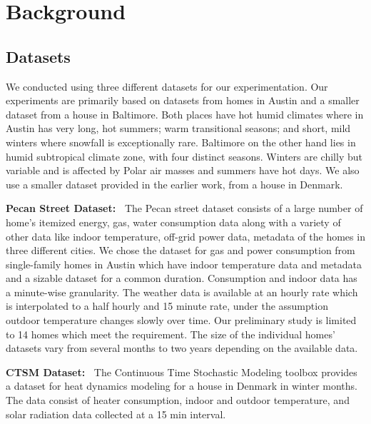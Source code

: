 
\section{Background}

\subsection{Datasets}
\indent We conducted using three different datasets for our experimentation. Our experiments are primarily based on datasets from homes in Austin and a smaller dataset from a house in Baltimore. Both places have hot humid climates where in Austin has very long, hot summers; warm transitional seasons; and short, mild winters where snowfall is exceptionally rare. Baltimore on the other hand lies in humid subtropical climate zone, with four distinct seasons. Winters are chilly but variable and is affected by Polar air masses and summers have hot days. We also use a smaller dataset provided in the earlier work, from a house in Denmark.

\indent \textbf{Pecan Street Dataset:~\cite{Pecan}} The Pecan street dataset consists of a large number of home's itemized energy, gas, water consumption data along with a variety of other data like indoor temperature, off-grid power data, metadata of the homes in three different cities. We chose the dataset for gas and power consumption from single-family homes in Austin which have indoor temperature data and metadata and a sizable dataset for a common duration. Consumption and indoor data has a minute-wise granularity. The weather data is available at an hourly rate which is interpolated to a half hourly and 15 minute rate, under the assumption outdoor temperature changes slowly over time. Our preliminary study is limited to 14 homes which meet the requirement. The size of the individual homes' datasets vary from several months to two years depending on the available data. 

\indent \textbf{CTSM Dataset:~\cite{CTSM}} The Continuous Time Stochastic Modeling toolbox provides a dataset for heat dynamics modeling for a house in Denmark in winter months. The data consist of heater consumption, indoor and outdoor temperature, and solar radiation data collected at a 15 min interval.

